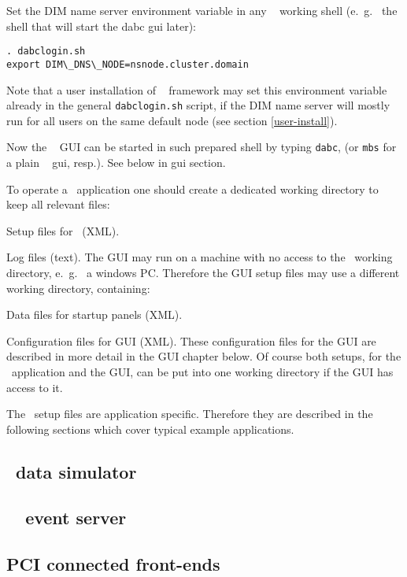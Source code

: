 \item Set the DIM name server environment variable in any \dabc~ working shell (e.~g.~
the shell that will start the dabc gui later):
\begin{verbatim}
. dabclogin.sh
export DIM\_DNS\_NODE=nsnode.cluster.domain
\end{verbatim} 
Note that a user installation of \dabc~ framework may set this 
environment variable already in the general {\tt dabclogin.sh} script, if the DIM name server will 
mostly run for all users on the same default node (see section \ref{user-install}).  

\item Now the \dabc~ GUI can be started in such prepared shell by typing {\tt dabc}, (or 
{\tt mbs} for a plain \mbs~ gui, resp.). See below in gui section.  

\enum


To operate a \dabc\ application one should create a dedicated 
working directory to keep all relevant files:
\bbul
\item Setup files for \dabc\ (XML).
\item Log files (text).
\ebul
The GUI may run on a machine with no access to the \dabc\ working directory,
e.~g.~ a windows PC.
Therefore the GUI setup files may use a different
working directory, containing: 
\bbul
\item Data files for startup panels (XML).
\item Configuration files for GUI (XML).
\ebul
These configuration files for the GUI are described in more detail 
in the GUI chapter below.
Of course both setups, for the \dabc\ application and the GUI, can be
put into one working directory if the GUI has access to it.

The \dabc\  setup files are application specific. Therefore they are described in
the following sections which cover typical example applications.

\subsection[DABC data simulator]{\dabc\ data simulator}
\subsection[DABC MBS event server]{\dabc\ \mbs\ event server}
\subsection{PCI connected front-ends}


